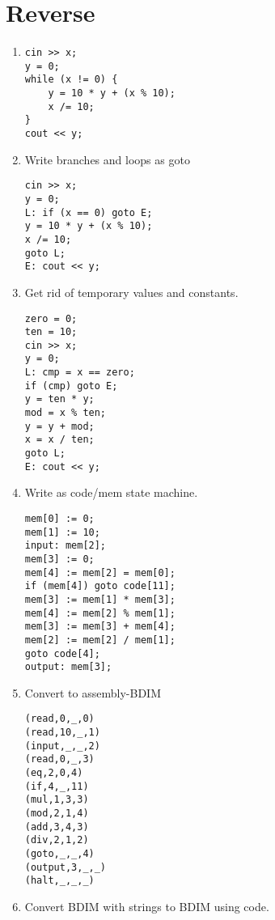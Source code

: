 \documentclass{scrartcl}
\begin{document}
\section{Reverse}
\begin{enumerate}
\item \begin{verbatim}
cin >> x;
y = 0;
while (x != 0) {
	y = 10 * y + (x % 10);
	x /= 10;
}
cout << y;
\end{verbatim}

\item Write branches and loops as goto
\begin{verbatim}
cin >> x;
y = 0;
L: if (x == 0) goto E;
y = 10 * y + (x % 10);
x /= 10;
goto L;
E: cout << y;
\end{verbatim}

\item Get rid of temporary values and constants.

\begin{verbatim}
zero = 0;
ten = 10;
cin >> x;
y = 0;
L: cmp = x == zero;
if (cmp) goto E;
y = ten * y;
mod = x % ten;
y = y + mod;
x = x / ten;
goto L;
E: cout << y;
\end{verbatim}

\item Write as code/mem state machine.
\begin{verbatim}
mem[0] := 0;
mem[1] := 10;
input: mem[2];
mem[3] := 0;
mem[4] := mem[2] = mem[0];
if (mem[4]) goto code[11];
mem[3] := mem[1] * mem[3];
mem[4] := mem[2] % mem[1];
mem[3] := mem[3] + mem[4];
mem[2] := mem[2] / mem[1];
goto code[4];
output: mem[3];
\end{verbatim}

\item Convert to assembly-BDIM
\begin{verbatim}
(read,0,_,0)
(read,10,_,1)
(input,_,_,2)
(read,0,_,3)
(eq,2,0,4)
(if,4,_,11)
(mul,1,3,3)
(mod,2,1,4)
(add,3,4,3)
(div,2,1,2)
(goto,_,_,4)
(output,3,_,_)
(halt,_,_,_)
\end{verbatim}

\item Convert BDIM with strings to BDIM using code.
	\inputminted[linenos,firstnumber=0]{text}{bdim/reverse.bdim}
\end{enumerate}
\end{document}
